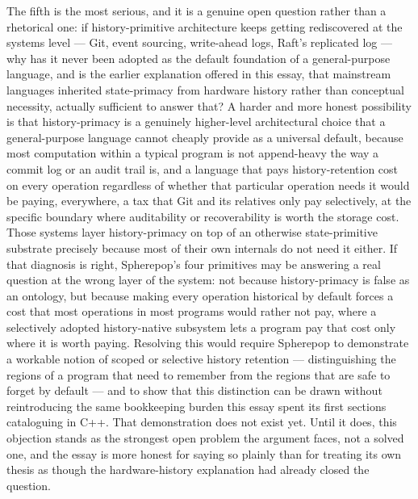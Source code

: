 \documentclass[11pt]{article}
\begin{document}
The fifth is the most serious, and it is a genuine open question rather than a rhetorical one: if history-primitive architecture keeps getting rediscovered at the systems level --- Git, event sourcing, write-ahead logs, Raft's replicated log --- why has it never been adopted as the default foundation of a general-purpose language, and is the earlier explanation offered in this essay, that mainstream languages inherited state-primacy from hardware history rather than conceptual necessity, actually sufficient to answer that? A harder and more honest possibility is that history-primacy is a genuinely higher-level architectural choice that a general-purpose language cannot cheaply provide as a universal default, because most computation within a typical program is not append-heavy the way a commit log or an audit trail is, and a language that pays history-retention cost on every operation regardless of whether that particular operation needs it would be paying, everywhere, a tax that Git and its relatives only pay selectively, at the specific boundary where auditability or recoverability is worth the storage cost. Those systems layer history-primacy on top of an otherwise state-primitive substrate precisely because most of their own internals do not need it either. If that diagnosis is right, Spherepop's four primitives may be answering a real question at the wrong layer of the system: not because history-primacy is false as an ontology, but because making every operation historical by default forces a cost that most operations in most programs would rather not pay, where a selectively adopted history-native subsystem lets a program pay that cost only where it is worth paying. Resolving this would require Spherepop to demonstrate a workable notion of scoped or selective history retention --- distinguishing the regions of a program that need to remember from the regions that are safe to forget by default --- and to show that this distinction can be drawn without reintroducing the same bookkeeping burden this essay spent its first sections cataloguing in C++. That demonstration does not exist yet. Until it does, this objection stands as the strongest open problem the argument faces, not a solved one, and the essay is more honest for saying so plainly than for treating its own thesis as though the hardware-history explanation had already closed the question.
\end{document}
